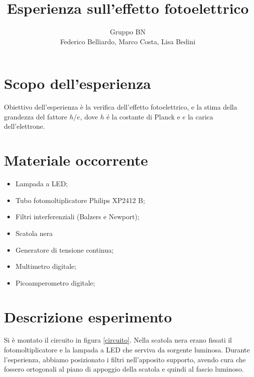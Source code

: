 \documentclass[10pt,a4paper]{article}
\author{Gruppo BN \\ Federico Belliardo, Marco Costa, Lisa Bedini}
\title{Esperienza sull'effetto fotoelettrico}
\begin{document}
\maketitle
\section{Scopo dell'esperienza}
Obiettivo dell'esperienza è la verifica dell'effetto fotoelettrico, e la stima della grandezza del fattore $h/e$, dove $h$ \'e la costante di Planck e $e$ la carica dell'elettrone.\\
\section{Materiale occorrente}
\begin{itemize}
\item Lampada a LED;
\item Tubo fotomoltiplicatore Philips XP2412 B;
\item Filtri interferenziali (Balzers e Newport);
\item Scatola nera
\item Generatore di tensione continua;
\item Multimetro digitale;
\item Picoamperometro digitale;
\end{itemize}
\section{Descrizione esperimento}

Si è montato il circuito in figura \ref{circuito}. Nella scatola nera erano fissati il fotomoltiplicatore e la lampada a LED che serviva da sorgente luminosa. Durante l'esperienza, abbiamo posizionato i filtri nell'apposito supporto, avendo cura che fossero ortogonali al piano di appoggio della scatola e quindi al fascio luminoso.
\end{document}
